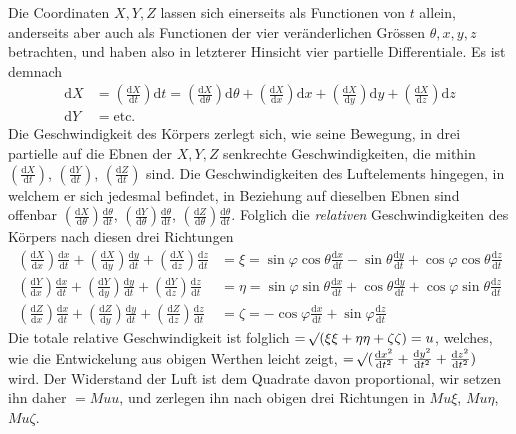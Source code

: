 Die Coordinaten $X,Y,Z$ lassen sich einerseits als Functionen von $t$ allein, anderseits aber auch als Functionen der vier veränderlichen Grössen $\theta,x,y,z$ betrachten, und haben also in letzterer Hinsicht vier partielle Differentiale. Es ist demnach
\[
\begin{aligned}
\mathrm{d}X&=(\tfrac{\mathrm{d}X}{\mathrm{d}t})\mathrm{d}t=(\tfrac{\mathrm{d}X}{\mathrm{d}\theta})\mathrm{d}\theta+(\tfrac{\mathrm{d}X}{\mathrm{d}x})\mathrm{d}x+(\tfrac{\mathrm{d}X}{\mathrm{d}y})\mathrm{d}y+(\tfrac{\mathrm{d}X}{\mathrm{d}z})\mathrm{d}z\\
\mathrm{d}Y&=\mathrm{etc.}
\end{aligned}
\]
Die Geschwindigkeit des Körpers zerlegt sich, wie seine Bewegung, in drei partielle auf die Ebnen der $X,Y,Z$ senkrechte Geschwindigkeiten, die mithin $(\tfrac{\mathrm{d}X}{\mathrm{d}t})$, $(\tfrac{\mathrm{d}Y}{\mathrm{d}t})$, $(\tfrac{\mathrm{d}Z}{\mathrm{d}t})$ sind. Die Geschwindigkeiten des Luftelements hingegen, in welchem er sich jedesmal befindet, in Beziehung auf dieselben Ebnen sind offenbar $(\tfrac{\mathrm{d}X}{\mathrm{d}\theta})\tfrac{\mathrm{d}\theta}{\mathrm{d}t}$, $(\tfrac{\mathrm{d}Y}{\mathrm{d}\theta})\tfrac{\mathrm{d}\theta}{\mathrm{d}t}$, $(\tfrac{\mathrm{d}Z}{\mathrm{d}\theta})\tfrac{\mathrm{d}\theta}{\mathrm{d}t}$. Folglich die \textit{relativen} Geschwindigkeiten des Körpers nach diesen drei Richtungen
\[
\begin{aligned}
(\tfrac{\mathrm{d}X}{\mathrm{d}x})\tfrac{\mathrm{d}x}{\mathrm{d}t}+(\tfrac{\mathrm{d}X}{\mathrm{d}y})\tfrac{\mathrm{d}y}{\mathrm{d}t}+(\tfrac{\mathrm{d}X}{\mathrm{d}z})\tfrac{\mathrm{d}z}{\mathrm{d}t}&=\xi=\sin\varphi\cos\theta\tfrac{\mathrm{d}x}{\mathrm{d}t}-\sin\theta\tfrac{\mathrm{d}y}{\mathrm{d}t}+\cos\varphi\cos\theta\tfrac{\mathrm{d}z}{\mathrm{d}t}\\
(\tfrac{\mathrm{d}Y}{\mathrm{d}x})\tfrac{\mathrm{d}x}{\mathrm{d}t}+(\tfrac{\mathrm{d}Y}{\mathrm{d}y})\tfrac{\mathrm{d}y}{\mathrm{d}t}+(\tfrac{\mathrm{d}Y}{\mathrm{d}z})\tfrac{\mathrm{d}z}{\mathrm{d}t}&=\eta=\sin\varphi\sin\theta\tfrac{\mathrm{d}x}{\mathrm{d}t}+\cos\theta\tfrac{\mathrm{d}y}{\mathrm{d}t}+\cos\varphi\sin\theta\tfrac{\mathrm{d}z}{\mathrm{d}t}\\
(\tfrac{\mathrm{d}Z}{\mathrm{d}x})\tfrac{\mathrm{d}x}{\mathrm{d}t}+(\tfrac{\mathrm{d}Z}{\mathrm{d}y})\tfrac{\mathrm{d}y}{\mathrm{d}t}+(\tfrac{\mathrm{d}Z}{\mathrm{d}z})\tfrac{\mathrm{d}z}{\mathrm{d}t}&=\zeta=-\cos\varphi\tfrac{\mathrm{d}x}{\mathrm{d}t}+\sin\varphi\tfrac{\mathrm{d}z}{\mathrm{d}t}
\end{aligned}
\]
Die totale relative Geschwindigkeit ist folglich $=\mathord{{}^{}\!\surd}(\xi\xi+\eta\eta+\zeta\zeta)=u$, welches, wie die Entwickelung aus obigen Werthen leicht zeigt, $=\mathord{{}^{}\!\surd}(\tfrac{\mathrm{d}x^2}{\mathrm{d}t^2}+\tfrac{\mathrm{d}y^2}{\mathrm{d}t^2}+\tfrac{\mathrm{d}z^2}{\mathrm{d}t^2})$ wird. Der Widerstand der Luft ist dem Quadrate davon proportional, wir setzen ihn daher $=Muu$, und zerlegen ihn nach obigen drei Richtungen in $Mu\xi$, $Mu\eta$, $Mu\zeta$.

